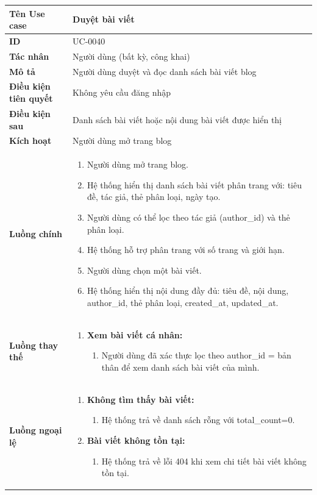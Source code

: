 {
\renewcommand{\arraystretch}{1.5}

\begin{tabularx}{\textwidth}{|>{\raggedright\arraybackslash}X|>{\raggedright\arraybackslash}X|}
\hline
\textbf{Tên Use case} & Duyệt bài viết \\
\hline
\textbf{ID} & UC-0040 \\
\hline
\textbf{Tác nhân} & Người dùng (bất kỳ, công khai) \\
\hline
\textbf{Mô tả} & Người dùng duyệt và đọc danh sách bài viết blog \\
\hline
\textbf{Điều kiện tiên quyết} & Không yêu cầu đăng nhập \\
\hline
\textbf{Điều kiện sau} & Danh sách bài viết hoặc nội dung bài viết được hiển thị \\
\hline
\textbf{Kích hoạt} & Người dùng mở trang blog \\
\hline
\textbf{Luồng chính} &
\begin{enumerate}
    \item Người dùng mở trang blog.
    \item Hệ thống hiển thị danh sách bài viết phân trang với: tiêu đề, tác giả, thẻ phân loại, ngày tạo.
    \item Người dùng có thể lọc theo tác giả (author\_id) và thẻ phân loại.
    \item Hệ thống hỗ trợ phân trang với số trang và giới hạn.
    \item Người dùng chọn một bài viết.
    \item Hệ thống hiển thị nội dung đầy đủ: tiêu đề, nội dung, author\_id, thẻ phân loại, created\_at, updated\_at.
\end{enumerate} \\
\hline
\textbf{Luồng thay thế} &
\begin{enumerate}
    \item \textbf{Xem bài viết cá nhân:}
    \begin{enumerate}
        \item[3A.] Người dùng đã xác thực lọc theo author\_id = bản thân để xem danh sách bài viết của mình.
    \end{enumerate}
\end{enumerate} \\
\hline
\textbf{Luồng ngoại lệ} &
\begin{enumerate}
    \item \textbf{Không tìm thấy bài viết:}
    \begin{enumerate}
        \item[2Err.] Hệ thống trả về danh sách rỗng với total\_count=0.
    \end{enumerate}
    \item \textbf{Bài viết không tồn tại:}
    \begin{enumerate}
        \item[6Err.] Hệ thống trả về lỗi 404 khi xem chi tiết bài viết không tồn tại.
    \end{enumerate}
\end{enumerate} \\
\hline
\end{tabularx}
}
